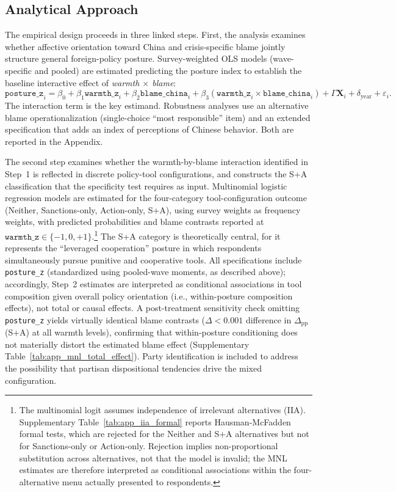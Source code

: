 \documentclass[12pt,letterpaper]{article}
\begin{document}
\subsection{Analytical Approach}

The empirical design proceeds in three linked steps. First, the analysis examines whether affective orientation toward China and crisis-specific blame jointly structure general foreign-policy posture. Survey-weighted OLS models (wave-specific and pooled) are estimated predicting the posture index to establish the baseline interactive effect of \emph{warmth $\times$ blame}:
\[
\texttt{posture\_z}_i = \beta_0 + \beta_1 \texttt{warmth\_z}_i + \beta_2 \texttt{blame\_china}_i + \beta_3 (\texttt{warmth\_z}_i \times \texttt{blame\_china}_i) + \Gamma \mathbf{X}_i + \delta_{\text{year}} + \varepsilon_i.
\]
The interaction term is the key estimand. Robustness analyses use an alternative blame operationalization (single-choice ``most responsible'' item) and an extended specification that adds an index of perceptions of Chinese behavior. Both are reported in the Appendix.

The second step examines whether the warmth-by-blame interaction identified in Step~1 is reflected in discrete policy-tool configurations, and constructs the S+A classification that the specificity test requires as input. Multinomial logistic regression models are estimated for the four-category tool-configuration outcome (Neither, Sanctions-only, Action-only, S+A), using survey weights as frequency weights, with predicted probabilities and blame contrasts reported at \( \texttt{warmth\_z} \in \{-1, 0, +1\} \).\footnote{The multinomial logit assumes independence of irrelevant alternatives (IIA). Supplementary Table~\ref{tab:app_iia_formal} reports Hausman-McFadden formal tests, which are rejected for the Neither and S+A alternatives but not for Sanctions-only or Action-only. Rejection implies non-proportional substitution across alternatives, not that the model is invalid; the MNL estimates are therefore interpreted as conditional associations within the four-alternative menu actually presented to respondents.} The S+A category is theoretically central, for it represents the ``leveraged cooperation'' posture in which respondents simultaneously pursue punitive and cooperative tools. All specifications include \texttt{posture\_z} (standardized using pooled-wave moments, as described above); accordingly, Step~2 estimates are interpreted as conditional associations in tool composition given overall policy orientation (i.e., within-posture composition effects), not total or causal effects. A post-treatment sensitivity check omitting \texttt{posture\_z} yields virtually identical blame contrasts ($\Delta < 0.001$ difference in $\Delta_{\text{pp}}$(S+A) at all warmth levels), confirming that within-posture conditioning does not materially distort the estimated blame effect (Supplementary Table~\ref{tab:app_mnl_total_effect}). Party identification is included to address the possibility that partisan dispositional tendencies drive the mixed configuration.
\end{document}
